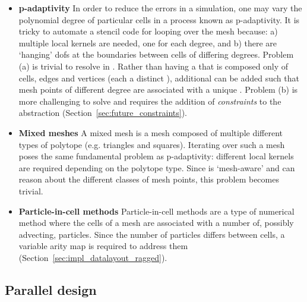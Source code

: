 \begin{itemize}
  \item
    \textbf{p-adaptivity}
    In order to reduce the errors in a simulation, one may vary the polynomial degree of particular cells in a process known as p-adaptivity.
    It is tricky to automate a stencil code for looping over the mesh because:
    a) multiple local kernels are needed, one for each degree, and b) there are `hanging' \glspl{dof} at the boundaries between cells of differing degrees.
    Problem (a) is trivial to resolve in .
    Rather than having a  that is composed only of cells, edges and vertices (each a distinct ), additional  can be added such that mesh points of different degree are associated with a unique .
    Problem (b) is more challenging to solve and requires the addition of \textit{constraints} to the abstraction (Section~\ref{sec:future_constraints}).

  \item
    \textbf{Mixed meshes}
    A mixed mesh is a mesh composed of multiple different types of polytope (e.g. triangles and squares).
    Iterating over such a mesh poses the same fundamental problem as p-adaptivity: different local kernels are required depending on the polytope type.
    Since  is `mesh-aware' and can reason about the different classes of mesh points, this problem becomes trivial.

  \item
    \textbf{Particle-in-cell methods}
    Particle-in-cell methods are a type of numerical method where the cells of a mesh are associated with a number of, possibly advecting, particles.
    Since the number of particles differs between cells, a variable arity map is required to address them (Section~\ref{sec:impl_datalayout_ragged}).
\end{itemize}

\subsection{Parallel design}
\label{sec:impl_parallel}

